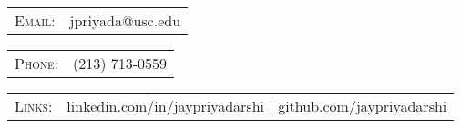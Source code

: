 \begin{tabular}{rl}
\textsc{Email:} & jpriyada@usc.edu\\
\end{tabular}
\hfill
\begin{tabular}{rl}
\textsc{\hspace{2.0cm}Phone:} & (213) 713-0559\\
\end{tabular}
\hfill

%
\begin{tabular}{rl}
\textsc{Links:} & \href{http://linkedin.com/in/jaypriyadarshi}{linkedin.com/in/jaypriyadarshi} \hspace{.5cm}|\hspace{.5cm} \href{http://github.com/jaypriyadarshi}{github.com/jaypriyadarshi}
\end{tabular}
\vspace{5pt}

